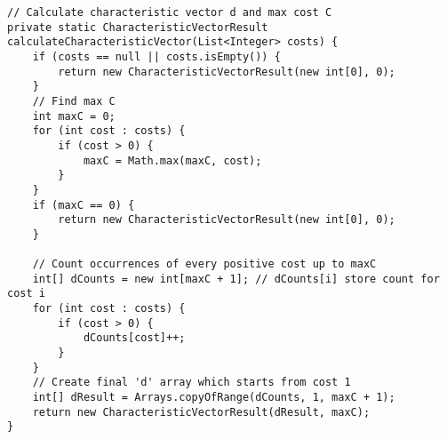\documentclass[a4paper,10pt,ngerman]{scrartcl}
\begin{document}
\begin{lstlisting}
// Calculate characteristic vector d and max cost C
private static CharacteristicVectorResult calculateCharacteristicVector(List<Integer> costs) {
    if (costs == null || costs.isEmpty()) {
        return new CharacteristicVectorResult(new int[0], 0);
    }
    // Find max C
    int maxC = 0;
    for (int cost : costs) {
        if (cost > 0) {
            maxC = Math.max(maxC, cost);
        }
    }
    if (maxC == 0) {
        return new CharacteristicVectorResult(new int[0], 0);
    }

    // Count occurrences of every positive cost up to maxC
    int[] dCounts = new int[maxC + 1]; // dCounts[i] store count for cost i
    for (int cost : costs) {
        if (cost > 0) {
            dCounts[cost]++;
        }
    }
    // Create final 'd' array which starts from cost 1
    int[] dResult = Arrays.copyOfRange(dCounts, 1, maxC + 1);
    return new CharacteristicVectorResult(dResult, maxC);
}
\end{lstlisting}
\end{document}
